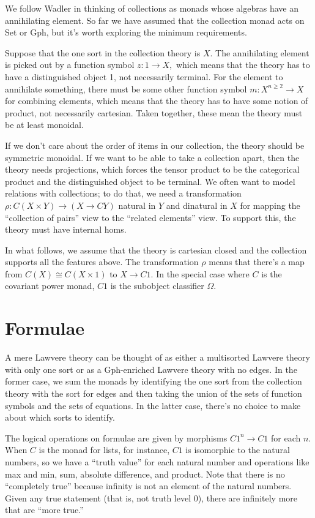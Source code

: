 \documentclass[sigplan,9pt,review,anonymous]{acmart}\settopmatter{printfolios=true,printccs=false,printacmref=false}
\newcommand{\maps}{\colon}
\begin{document}
We follow Wadler \cite{ComprehendingMonads} in thinking of collections as monads whose algebras have an annihilating element.  So far we have assumed that the collection monad acts on Set or Gph, but it's worth exploring the minimum requirements.  

Suppose that the one sort in the collection theory is $X.$  The annihilating element is picked out by a function symbol ${z\maps 1 \to X,}$ which means that the theory has to have a distinguished object 1, not necessarily terminal.  For the element to annihilate something, there must be some other function symbol ${m\maps X^{n \ge 2} \to X}$ for combining elements, which means that the theory has to have some notion of product, not necessarily cartesian.  Taken together, these mean the theory must be at least monoidal.  

If we don't care about the order of items in our collection, the theory should be symmetric monoidal.  If we want to be able to take a collection apart, then the theory needs projections, which forces the tensor product to be the categorical product and the distinguished object to be terminal.  We often want to model relations with collections; to do that, we need a transformation ${\rho\maps C(X\times Y) \to (X \to CY)}$ natural in $Y$ and dinatural in $X$ for mapping the ``collection of pairs'' view to the ``related elements'' view.  To support this, the theory must have internal homs.  

In what follows, we assume that the theory is cartesian closed and the collection supports all the features above.  The transformation $\rho$ means that there's a map from ${C(X)\cong C(X \times 1)}$ to ${X \to C1.}$  In the special case where $C$ is the covariant power monad, $C1$ is the subobject classifier $\Omega.$

\section{Formulae}

A mere Lawvere theory can be thought of as either a multisorted Lawvere theory with only one sort or as a Gph-enriched Lawvere theory with no edges.  In the former case, we sum the monads by identifying the one sort from the collection theory with the sort for edges and then taking the union of the sets of function symbols and the sets of equations.  In the latter case, there's no choice to make about which sorts to identify.

The logical operations on formulae are given by morphisms $C1^n \to C1$ for each $n.$  When $C$ is the monad for lists, for instance, $C1$ is isomorphic to the natural numbers, so we have a ``truth value'' for each natural number and operations like max and min, sum, absolute difference, and product.  Note that there is no ``completely true'' because infinity is not an element of the natural numbers.  Given any true statement (that is, not truth level 0), there are infinitely more that are ``more true.''
\end{document}
